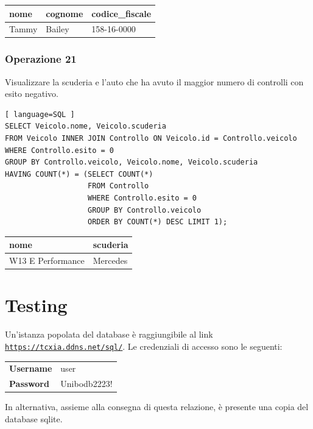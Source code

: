 \documentclass[11pt]{article}
\begin{document}
\begin{table}[H]
    \centering
    \begin{tabular}{|l|l|l|}
    \hline
        \textbf{nome} & \textbf{cognome} & \textbf{codice\_fiscale} \\ \hline
        Tammy & Bailey & 158-16-0000 \\ \hline
    \end{tabular}
\end{table}


\subsubsection{Operazione 21}
Visualizzare la scuderia e l'auto che ha avuto il maggior numero di controlli con esito negativo.
\begin{lstlisting}[ language=SQL ]
SELECT Veicolo.nome, Veicolo.scuderia
FROM Veicolo INNER JOIN Controllo ON Veicolo.id = Controllo.veicolo
WHERE Controllo.esito = 0
GROUP BY Controllo.veicolo, Veicolo.nome, Veicolo.scuderia
HAVING COUNT(*) = (SELECT COUNT(*)
                   FROM Controllo
                   WHERE Controllo.esito = 0
                   GROUP BY Controllo.veicolo
                   ORDER BY COUNT(*) DESC LIMIT 1);
\end{lstlisting}

\begin{table}[H]
    \centering
    \begin{tabular}{|l|l|}
    \hline
        \textbf{nome} & \textbf{scuderia} \\ \hline
        W13 E Performance & Mercedes \\ \hline
    \end{tabular}
\end{table}


\section{Testing}
Un'istanza popolata del database è raggiungibile al link \href{https://tcxia.ddns.net/sql/}{\texttt{https://tcxia.ddns.net/sql/}}.
Le credenziali di accesso sono le seguenti:\\
\begin{center}
    \begin{tabular}{l l}
        \textbf{Username} & user \\
        \textbf{Password} & Unibodb2223! \\
    \end{tabular}
\end{center}

In alternativa, assieme alla consegna di questa relazione, è presente una copia del database sqlite.
\end{document}
